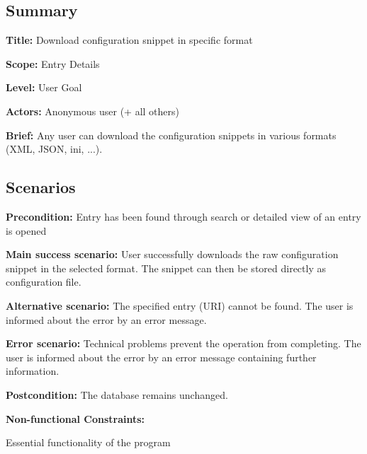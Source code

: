 \subsection*{Summary}


\begin{DoxyItemize}
\item {\bfseries Title\+:} Download configuration snippet in specific format
\item {\bfseries Scope\+:} Entry Details
\item {\bfseries Level\+:} User Goal
\item {\bfseries Actors\+:} Anonymous user (+ all others)
\item {\bfseries Brief\+:} Any user can download the configuration snippets in various formats (X\+ML, J\+S\+ON, ini, ...).
\end{DoxyItemize}

\subsection*{Scenarios}


\begin{DoxyItemize}
\item {\bfseries Precondition\+:} Entry has been found through search or detailed view of an entry is opened
\item {\bfseries Main success scenario\+:} User successfully downloads the raw configuration snippet in the selected format. The snippet can then be stored directly as configuration file.
\item {\bfseries Alternative scenario\+:} The specified entry (U\+RI) cannot be found. The user is informed about the error by an error message.
\item {\bfseries Error scenario\+:} Technical problems prevent the operation from completing. The user is informed about the error by an error message containing further information.
\item {\bfseries Postcondition\+:} The database remains unchanged.
\item {\bfseries Non-\/functional Constraints\+:}
\begin{DoxyItemize}
\item Essential functionality of the program 
\end{DoxyItemize}
\end{DoxyItemize}